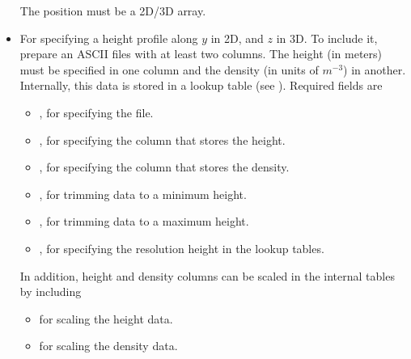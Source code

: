 \documentclass[letterpaper,10pt,english]{sphinxmanual}
\begin{document}
\begin{itemize}
\begin{itemize}
\end{itemize}

\sphinxAtStartPar
The position must be a 2D/3D array.

\item {} 
\sphinxAtStartPar
{} For specifying a height profile along \(y\) in 2D, and \(z\) in 3D.
To include it, prepare an ASCII files with at least two columns.
The height (in meters) must be specified in one column and the density (in units of \(m^{-3}\)) in another.
Internally, this data is stored in a lookup table (see {\hyperref[\detokenize{Utilities/LookupTable:chap-lookuptable}]{}}).
Required fields are
\begin{itemize}
\item {} 
\sphinxAtStartPar
{} , for specifying the file.

\item {} 
\sphinxAtStartPar
{}, for specifying the column that stores the height.

\item {} 
\sphinxAtStartPar
{}, for specifying the column that stores the density.

\item {} 
\sphinxAtStartPar
{}, for trimming data to a minimum height.

\item {} 
\sphinxAtStartPar
{}, for trimming data to a maximum height.

\item {} 
\sphinxAtStartPar
{}, for specifying the resolution height in the  lookup tables.

\end{itemize}

\sphinxAtStartPar
In addition, height and density columns can be scaled in the internal tables by including
\begin{itemize}
\item {} 
\sphinxAtStartPar
{} for scaling the height data.

\item {} 
\sphinxAtStartPar
{} for scaling the density data.

\end{itemize}

\end{itemize}
\end{document}
